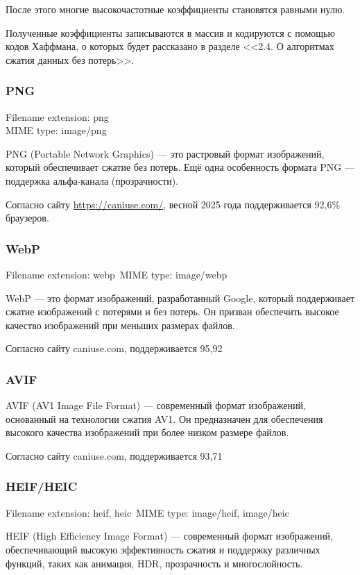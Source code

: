\documentclass[12pt]{article}
\begin{document}
После этого многие высокочастотные коэффициенты становятся равными нулю.

Полученные коэффициенты записываются в массив и кодируются с помощью кодов Хаффмана,
о которых будет рассказано в разделе <<2.4. О алгоритмах сжатия данных без потерь>>.

\subsubsection{PNG}

Filename extension: png\\
MIME type: image/png

PNG (Portable Network Graphics) — это растровый формат изображений, который обеспечивает сжатие
без потерь. Ещё одна особенность формата PNG — поддержка альфа-канала (прозрачности).

Согласно сайту \url{https://caniuse.com/}, весной 2025 года поддерживается 92{,}6\% браузеров.

\subsubsection{WebP}
Filename extension: webp\
MIME type: image/webp

WebP — это формат изображений, разработанный Google, который поддерживает сжатие изображений
с потерями и без потерь. Он призван обеспечить высокое качество изображений при меньших размерах файлов.\

Согласно сайту caniuse.com, поддерживается 95,92%

\subsubsection{AVIF}

AVIF (AV1 Image File Format) — современный формат изображений,
основанный на технологии сжатия AV1. Он предназначен для обеспечения высокого
качества изображений при более низком размере файлов.

Согласно сайту caniuse.com, поддерживается 93,71%

\subsubsection{HEIF/HEIC}
Filename extension: heif, heic\
MIME type: image/heif, image/heic\

HEIF (High Efficiency Image Format) — современный формат изображений,
обеспечивающий высокую эффективность сжатия и поддержку различных функций,
таких как анимация, HDR, прозрачность и многослойность.
\end{document}
